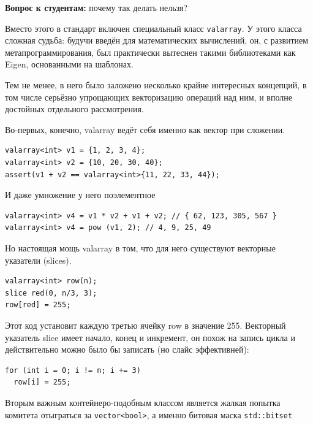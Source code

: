 \documentclass[a4paper,12pt,oneside]{book}
\newif\ifanswers
\begin{document}
\textbf{Вопрос к студентам:} почему так делать нельзя?

\ifanswers
Правильный ответ: к этому моменту \lstinline!vector<bool>! уже должен был кое-чему нас научить. Каждая специализация такого рода внутри стандартной библиотеки это потенциальная проблема для использования вектора в обобщённом контексте.
\fi

Вместо этого в стандарт включен специальный класс \lstinline!valarray!. У этого класса сложная судьба: будучи введён для математических вычислений, он, с развитием метапрограммирования, был практически вытеснен такими библиотеками как Eigen, основанными на шаблонах.

Тем не менее, в него было заложено несколько крайне интересных концепций, в том числе серьёзно упрощающих векторизацию операций над ним, и вполне достойных отдельного рассмотрения.

Во-первых, конечно, valarray ведёт себя именно как вектор при сложении.

\begin{lstlisting}
valarray<int> v1 = {1, 2, 3, 4};
valarray<int> v2 = {10, 20, 30, 40};
assert(v1 + v2 == valarray<int>{11, 22, 33, 44});
\end{lstlisting}

И даже умножение у него поэлементное

\begin{lstlisting}
valarray<int> v4 = v1 * v2 + v1 + v2; // { 62, 123, 305, 567 }
valarray<int> v4 = pow (v1, 2); // 4, 9, 25, 49
\end{lstlisting}

Но настоящая мощь valarray в том, что для него существуют векторные указатели (slices).

\begin{lstlisting}
valarray<int> row(n);
slice red(0, n/3, 3);
row[red] = 255; 
\end{lstlisting}

Этот код установит каждую третью ячейку row в значение 255.
Векторный указатель slice имеет начало, конец и инкремент, он похож на запись цикла и действительно можно было бы записать (но слайс эффективней):

\begin{lstlisting}
for (int i = 0; i != n; i += 3)
  row[i] = 255;
\end{lstlisting}

Вторым важным контейнеро-подобным классом является жалкая попытка комитета отыграться за \lstinline!vector<bool>!, а именно битовая маска \lstinline!std::bitset!
\end{document}
